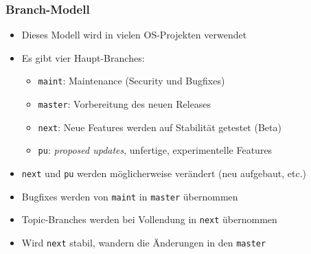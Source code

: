 \documentclass{beamer}
\begin{document}
\begin{frame}
 \frametitle{Branch-Modell}
  


\begin{itemize}
  \item Dieses Modell wird in vielen OS-Projekten verwendet
  \item Es gibt vier Haupt-Branches:
\begin{itemize}
  \item \texttt{maint}: Maintenance (Security und Bugfixes)
  \item \texttt{master}: Vorbereitung des neuen Releases
  \item \texttt{next}: Neue Features werden auf Stabilität getestet (Beta)
  \item \texttt{pu}: \emph{proposed updates}, unfertige, experimentelle Features
\end{itemize}
  \item \texttt{next} und \texttt{pu} werden möglicherweise verändert (neu aufgebaut, etc.)
  \item Bugfixes werden von \texttt{maint} in \texttt{master} übernommen
  \item Topic-Branches werden bei Vollendung in \texttt{next} übernommen
  \item Wird \texttt{next} stabil, wandern die Änderungen in den \texttt{master}
\end{itemize}

  
 \end{frame}
\end{document}
